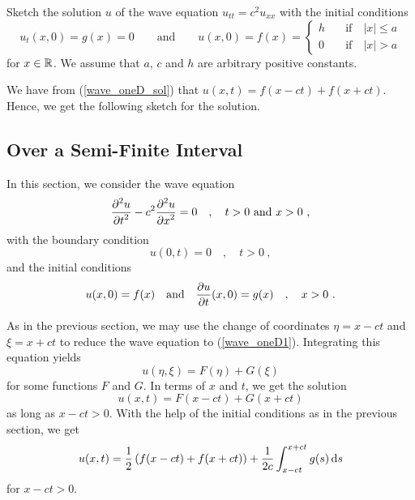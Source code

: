 
\begin{egg}
Sketch the solution $u$ of the wave equation $\displaystyle u_{tt} = c^2 u_{xx}$
with the initial conditions
\[
u_t(x,0) = g(x) = 0 \qquad \text{and} \qquad
u(x,0) = f(x) =
\begin{cases}
h & \quad \text{if} \quad |x| \leq a \\
0 & \quad \text{if} \quad |x| > a
\end{cases}
\]
for $x \in \mathbb{R}$.  We assume that $a$, $c$ and $h$ are arbitrary
positive constants.

We have from (\ref{wave_oneD_sol}) that $u(x,t) = f(x-ct) +
f(x+ct)$.  Hence, we get the following sketch for the solution.
\begin{center}
\end{center}
\end{egg}

\subsection{Over a Semi-Finite Interval}

In this section, we consider the wave equation
\[
\frac{\displaystyle \partial^{2}{u}} {\displaystyle \partial t^{2}} - c^2 \frac{\displaystyle \partial^{2}{u}} {\displaystyle \partial x^{2}} = 0 \quad ,
\quad t >0 \text{ and } x > 0 \ ,
\]
with the boundary condition
\begin{equation}\label{wave_oneDHLBC}
u(0,t) = 0  \quad , \quad t>0 \ ,
\end{equation}
and the initial conditions
\[
u(x,0) = f(x) \quad \text{and} \quad \frac{\partial{u}}{\partial t}(x,0) = g(x) \quad ,
\quad x > 0 \ .
\]

As in the previous section, we may use the change of coordinates $\eta
= x-ct$ and $\xi = x +ct$ to reduce the wave equation to
(\ref{wave_oneD1}).  Integrating this equation yields
\begin{equation}\label{wave_oneDHL1}
u(\eta,\xi) = F(\eta) + G(\xi)
\end{equation}
for some functions $F$ and $G$.  In terms of $x$ and $t$, we get the
solution
\[
u(x,t) = F(x-ct) + G(x+ct)
\]
as long as $x-ct>0$.  With the help of the initial conditions as in
the previous section, we get
\begin{equation}\label{wave_oneDHLsolp}
u(x,t) = \frac{1}{2} \left(f(x-ct) + f(x+ct)\right)
+ \frac{1}{2c} \int_{x-ct}^{x+ct} g(s)\,\mathrm{d}{s}
\end{equation}
for $x-ct > 0$.

